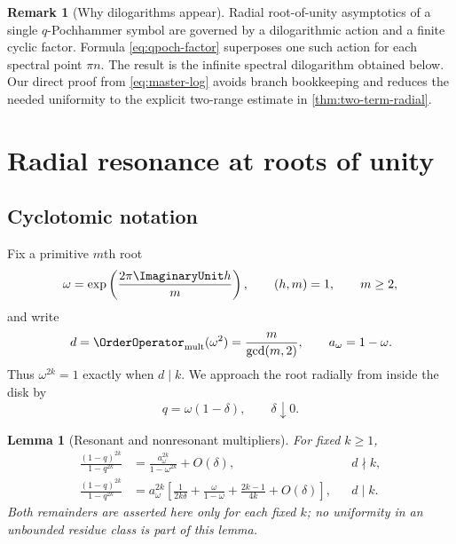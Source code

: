\documentclass[11pt]{article}
\newtheorem{lemma}[theorem]{Lemma}
\theoremstyle{definition}
\newtheorem{remark}[theorem]{Remark}
\begin{document}
\begin{remark}[Why dilogarithms appear]
Radial root-of-unity asymptotics of a single $q$-Pochhammer symbol are governed by a dilogarithmic action and a finite cyclic factor.  Formula \cref{eq:qpoch-factor} superposes one such action for each spectral point $\pi n$.  The result is the infinite spectral dilogarithm obtained below.  Our direct proof from \cref{eq:master-log} avoids branch bookkeeping and reduces the needed uniformity to the explicit two-range estimate in \cref{thm:two-term-radial}.
\end{remark}

\section{Radial resonance at roots of unity}

\subsection{Cyclotomic notation}

Fix a primitive $m$th root
\begin{equation}
 \omega=\exp\left(\frac{2\pi\ImaginaryUnit h}{m}\right),
 \qquad (h,m)=1,
 \qquad m\ge2,
 \label{eq:omega}
\end{equation}
and write
\begin{equation}
 d=\OrderOperator_{\mathrm{mult}}(\omega^2)=\frac{m}{\gcd(m,2)},
 \qquad
 a_\omega=1-\omega.
 \label{eq:d-a}
\end{equation}
Thus $\omega^{2k}=1$ exactly when $d\mid k$.  We approach the root radially from inside the disk by
\begin{equation}
 q=\omega(1-\delta),
 \qquad \delta\downarrow0.
 \label{eq:radial-q}
\end{equation}

\begin{lemma}[Resonant and nonresonant multipliers]
For fixed $k\ge1$,
\begin{align}
 \frac{(1-q)^{2k}}{1-q^{2k}}
 &=\frac{a_\omega^{2k}}{1-\omega^{2k}}+O(\delta),
 && d\nmid k,
 \label{eq:nonres-exp}\\[3pt]
 \frac{(1-q)^{2k}}{1-q^{2k}}
 &=a_\omega^{2k}\left[
 \frac{1}{2k\delta}
 +\frac{\omega}{1-\omega}
 +\frac{2k-1}{4k}
 +O(\delta)
 \right],
 && d\mid k.
 \label{eq:res-exp}
\end{align}
Both remainders are asserted here only for each fixed $k$; no uniformity in an
unbounded residue class is part of this lemma.
\end{lemma}
\end{document}
